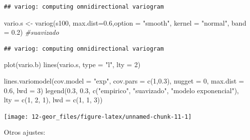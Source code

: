 \documentclass[
  spanish,
]{book}
\newenvironment{Shaded}{\begin{snugshade}}{\end{snugshade}}
\newcommand{\AttributeTok}[1]{\textcolor[rgb]{0.77,0.63,0.00}{#1}}
\newcommand{\CommentTok}[1]{\textcolor[rgb]{0.56,0.35,0.01}{\textit{#1}}}
\newcommand{\DecValTok}[1]{\textcolor[rgb]{0.00,0.00,0.81}{#1}}
\newcommand{\FloatTok}[1]{\textcolor[rgb]{0.00,0.00,0.81}{#1}}
\newcommand{\FunctionTok}[1]{\textcolor[rgb]{0.00,0.00,0.00}{#1}}
\newcommand{\NormalTok}[1]{#1}
\newcommand{\OtherTok}[1]{\textcolor[rgb]{0.56,0.35,0.01}{#1}}
\newcommand{\StringTok}[1]{\textcolor[rgb]{0.31,0.60,0.02}{#1}}
\theoremstyle{break}
\begin{document}
\begin{verbatim}
## variog: computing omnidirectional variogram
\end{verbatim}

\begin{Shaded}
\begin{Highlighting}[]
\NormalTok{vario.s }\OtherTok{\textless{}{-}} \FunctionTok{variog}\NormalTok{(s100, }\AttributeTok{max.dist=}\FloatTok{0.6}\NormalTok{,}\AttributeTok{option =} \StringTok{"smooth"}\NormalTok{, }\AttributeTok{kernel =} \StringTok{"normal"}\NormalTok{, }\AttributeTok{band =} \FloatTok{0.2}\NormalTok{)  }\CommentTok{\#suavizado}
\end{Highlighting}
\end{Shaded}

\begin{verbatim}
## variog: computing omnidirectional variogram
\end{verbatim}

\begin{Shaded}
\begin{Highlighting}[]
\FunctionTok{plot}\NormalTok{(vario.b)}
\FunctionTok{lines}\NormalTok{(vario.s, }\AttributeTok{type =} \StringTok{"l"}\NormalTok{, }\AttributeTok{lty =} \DecValTok{2}\NormalTok{)}

\FunctionTok{lines.variomodel}\NormalTok{(}\AttributeTok{cov.model =} \StringTok{"exp"}\NormalTok{, }\AttributeTok{cov.pars =} \FunctionTok{c}\NormalTok{(}\DecValTok{1}\NormalTok{,}\FloatTok{0.3}\NormalTok{), }\AttributeTok{nugget =} \DecValTok{0}\NormalTok{, }\AttributeTok{max.dist =} \FloatTok{0.6}\NormalTok{, }\AttributeTok{lwd =} \DecValTok{3}\NormalTok{)}
\FunctionTok{legend}\NormalTok{(}\FloatTok{0.3}\NormalTok{, }\FloatTok{0.3}\NormalTok{, }\FunctionTok{c}\NormalTok{(}\StringTok{"empirico"}\NormalTok{, }\StringTok{"suavizado"}\NormalTok{, }\StringTok{"modelo exponencial"}\NormalTok{), }\AttributeTok{lty =} \FunctionTok{c}\NormalTok{(}\DecValTok{1}\NormalTok{, }\DecValTok{2}\NormalTok{, }\DecValTok{1}\NormalTok{), }\AttributeTok{lwd =} \FunctionTok{c}\NormalTok{(}\DecValTok{1}\NormalTok{, }\DecValTok{1}\NormalTok{, }\DecValTok{3}\NormalTok{))}
\end{Highlighting}
\end{Shaded}

\begin{center}\texttt{[image: 12-geor\_files/figure-latex/unnamed-chunk-11-1]} \end{center}

Otros ajustes:
\end{document}
